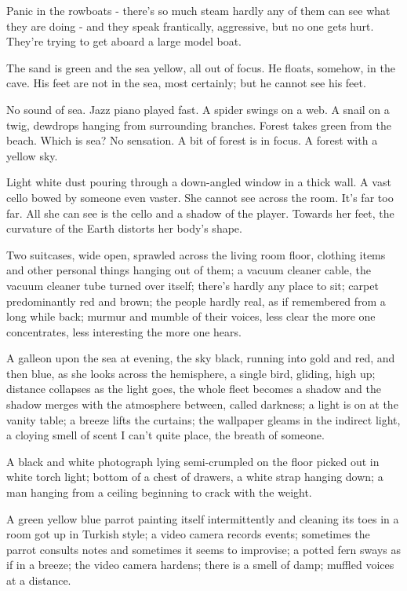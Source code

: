 \documentclass[
]{memoir}
\newlength{\drop}%
\begin{document}
Panic in the rowboats - there's so much steam hardly any of them can see
what they are doing - and they speak frantically, aggressive, but no one
gets hurt. They're trying to get aboard a large model boat.

The sand is green and the sea yellow, all out of focus. He floats,
somehow, in the cave. His feet are not in the sea, most certainly; but
he cannot see his feet.

No sound of sea. Jazz piano played fast. A spider swings on a web. A
snail on a twig, dewdrops hanging from surrounding branches. Forest
takes green from the beach. Which is sea? No sensation. A bit of forest
is in focus. A forest with a yellow sky.

Light white dust pouring through a down-angled window in a thick wall. A
vast cello bowed by someone even vaster. She cannot see across the room.
It's far too far. All she can see is the cello and a shadow of the
player. Towards her feet, the curvature of the Earth distorts her body's
shape.

Two suitcases, wide open, sprawled across the living room floor,
clothing items and other personal things hanging out of them; a vacuum
cleaner cable, the vacuum cleaner tube turned over itself; there's
hardly any place to sit; carpet predominantly red and brown; the people
hardly real, as if remembered from a long while back; murmur and mumble
of their voices, less clear the more one concentrates, less interesting
the more one hears.

A galleon upon the sea at evening, the sky black, running into gold and
red, and then blue, as she looks across the hemisphere, a single bird,
gliding, high up; distance collapses as the light goes, the whole fleet
becomes a shadow and the shadow merges with the atmosphere between,
called darkness; a light is on at the vanity table; a breeze lifts the
curtains; the wallpaper gleams in the indirect light, a cloying smell of
scent I can't quite place, the breath of someone.

A black and white photograph lying semi-crumpled on the floor picked out
in white torch light; bottom of a chest of drawers, a white strap
hanging down; a man hanging from a ceiling beginning to crack with the
weight.

A green yellow blue parrot painting itself intermittently and cleaning
its toes in a room got up in Turkish style; a video camera records
events; sometimes the parrot consults notes and sometimes it seems to
improvise; a potted fern sways as if in a breeze; the video camera
hardens; there is a smell of damp; muffled voices at a distance.
\end{document}
